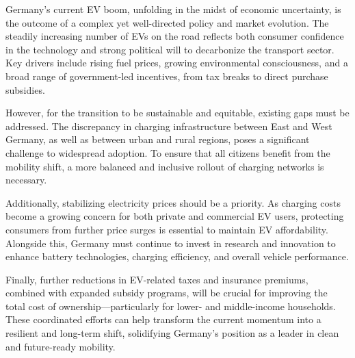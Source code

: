 Germany’s current EV boom, unfolding in the midst of economic uncertainty, is the outcome of a complex yet well-directed policy and market evolution. The steadily increasing number of EVs on the road reflects both consumer confidence in the technology and strong political will to decarbonize the transport sector. Key drivers include rising fuel prices, growing environmental consciousness, and a broad range of government-led incentives, from tax breaks to direct purchase subsidies.

However, for the transition to be sustainable and equitable, existing gaps must be addressed. The discrepancy in charging infrastructure between East and West Germany, as well as between urban and rural regions, poses a significant challenge to widespread adoption. To ensure that all citizens benefit from the mobility shift, a more balanced and inclusive rollout of charging networks is necessary.

Additionally, stabilizing electricity prices should be a priority. As charging costs become a growing concern for both private and commercial EV users, protecting consumers from further price surges is essential to maintain EV affordability. Alongside this, Germany must continue to invest in research and innovation to enhance battery technologies, charging efficiency, and overall vehicle performance.

Finally, further reductions in EV-related taxes and insurance premiums, combined with expanded subsidy programs, will be crucial for improving the total cost of ownership—particularly for lower- and middle-income households. These coordinated efforts can help transform the current momentum into a resilient and long-term shift, solidifying Germany’s position as a leader in clean and future-ready mobility.